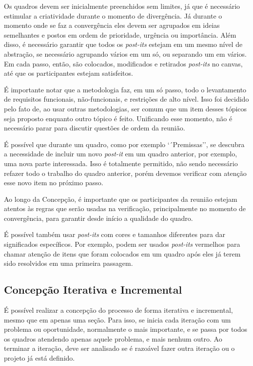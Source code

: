 \documentclass[fontsize=12pt, a4paper,pagesize=auto,toc=listof, ,twoside,chapterprefix=false,appendixprefix=true,open=right]{scrbook}
\begin{document}
Os quadros devem ser inicialmente preenchidos sem limites, já que é necessário estimular a criatividade durante o momento de divergência. Já durante o momento onde se faz a convergência eles devem ser agrupados em ideias semelhantes e postos em ordem de prioridade, urgência ou importância. Além disso, é necessário garantir que todos os \textit{post-its} estejam em um mesmo nível de abstração, se necessário agrupando vários em um só, ou separando um em vários.
Em cada passo, então, são colocados, modificados e retirados \textit{post-its} no canvas, até que os participantes estejam satisfeitos.

É importante notar que a metodologia faz, em um só passo, todo o levantamento de requisitos funcionais, não-funcionais, e restrições de alto nível. Isso foi decidido pelo fato de, ao usar outras metodologias, ser comum que um item desses tópicos seja proposto enquanto outro tópico é feito. Unificando esse momento, não é necessário parar para discutir questões de ordem da reunião.

É possível que durante um quadro, como por exemplo `´Premissas'', se descubra a necessidade de incluir um novo \textit{post-it} em um quadro anterior, por exemplo, uma nova parte interessada. Isso é totalmente permitido, não sendo necessário refazer todo o trabalho do quadro anterior, porém devemos verificar com atenção esse novo item no próximo passo.

Ao longo da Concepção, é importante que os participantes da reunião estejam atentos às regras que serão usadas na verificação, principalmente no momento de convergência, para garantir desde início a qualidade do quadro.

É possível também usar \textit{post-its} com cores e tamanhos diferentes para dar significados específicos. Por exemplo, podem ser usados \textit{post-its} vermelhos para chamar atenção de itens que foram colocados em um quadro após eles já terem sido resolvidos em uma primeira passagem.

\subsection{Concepção Iterativa e Incremental}

É possível realizar a concepção do processo de forma iterativa e incremental, mesmo que em apenas uma seção. Para isso, se inicia cada iteração com um problema ou oportunidade, normalmente o mais importante, e se passa por todos os quadros atendendo apenas aquele problema, e mais nenhum outro. Ao terminar a iteração, deve ser analisado se é razoável fazer outra iteração ou o projeto já está definido.
\end{document}
